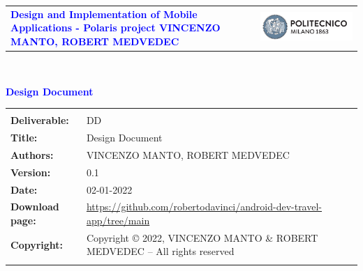 




\begin{titlepage}



{\begin{table}[t!]
\centering
\begin{tabu} to \textwidth { X[1.3,r,p] X[1.7,l,p] }
\textcolor{Blue}
{\textbf{\small{Design and Implementation of Mobile Applications  - Polaris project VINCENZO MANTO, ROBERT MEDVEDEC}}} & \includegraphics[scale=0.5]{Images/PolimiLogo}
\end{tabu}
\end{table}}~\\ [7cm]


\begin{flushleft}

{\textcolor{Blue}{\textbf{\Huge{Design Document}}}} \\ [1cm]

\end{flushleft}

\end{titlepage}

\begin{table}[h!]
\begin{tabu} to \textwidth { X[0.3,r,p] X[0.7,l,p] }
\hline
\\
\textbf{Deliverable:} & DD\\
\textbf{Title:} & Design Document \\
\textbf{Authors:} & VINCENZO MANTO, ROBERT MEDVEDEC \\
\textbf{Version:} & 0.1 \\ 
\textbf{Date:} & 02-01-2022 \\
\textbf{Download page:} & \url{https://github.com/robertodavinci/android-dev-travel-app/tree/main} \\
\textbf{Copyright:} & Copyright © 2022, VINCENZO MANTO \& ROBERT MEDVEDEC – All rights reserved \\
\\
\hline
\end{tabu}
\end{table}




